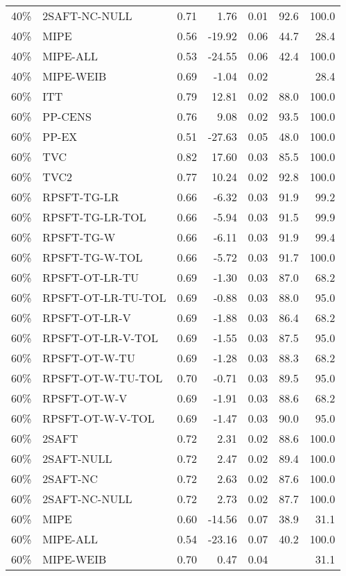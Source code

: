\begin{table}[ht]
{\begin{tabular}{llrrrrr}
  40\% & 2SAFT-NC-NULL & 0.71 & 1.76 & 0.01 & 92.6 & 100.0 \\ 
  40\% & MIPE & 0.56 & -19.92 & 0.06 & 44.7 & 28.4 \\ 
  40\% & MIPE-ALL & 0.53 & -24.55 & 0.06 & 42.4 & 100.0 \\ 
  40\% & MIPE-WEIB & 0.69 & -1.04 & 0.02 &  & 28.4 \\ 
   \hline
60\% & ITT & 0.79 & 12.81 & 0.02 & 88.0 & 100.0 \\ 
  60\% & PP-CENS & 0.76 & 9.08 & 0.02 & 93.5 & 100.0 \\ 
  60\% & PP-EX & 0.51 & -27.63 & 0.05 & 48.0 & 100.0 \\ 
  60\% & TVC & 0.82 & 17.60 & 0.03 & 85.5 & 100.0 \\ 
  60\% & TVC2 & 0.77 & 10.24 & 0.02 & 92.8 & 100.0 \\ 
   \hline
60\% & RPSFT-TG-LR & 0.66 & -6.32 & 0.03 & 91.9 & 99.2 \\ 
  60\% & RPSFT-TG-LR-TOL & 0.66 & -5.94 & 0.03 & 91.5 & 99.9 \\ 
  60\% & RPSFT-TG-W & 0.66 & -6.11 & 0.03 & 91.9 & 99.4 \\ 
  60\% & RPSFT-TG-W-TOL & 0.66 & -5.72 & 0.03 & 91.7 & 100.0 \\ 
  60\% & RPSFT-OT-LR-TU & 0.69 & -1.30 & 0.03 & 87.0 & 68.2 \\ 
  60\% & RPSFT-OT-LR-TU-TOL & 0.69 & -0.88 & 0.03 & 88.0 & 95.0 \\ 
  60\% & RPSFT-OT-LR-V & 0.69 & -1.88 & 0.03 & 86.4 & 68.2 \\ 
  60\% & RPSFT-OT-LR-V-TOL & 0.69 & -1.55 & 0.03 & 87.5 & 95.0 \\ 
   \hline
60\% & RPSFT-OT-W-TU & 0.69 & -1.28 & 0.03 & 88.3 & 68.2 \\ 
  60\% & RPSFT-OT-W-TU-TOL & 0.70 & -0.71 & 0.03 & 89.5 & 95.0 \\ 
  60\% & RPSFT-OT-W-V & 0.69 & -1.91 & 0.03 & 88.6 & 68.2 \\ 
  60\% & RPSFT-OT-W-V-TOL & 0.69 & -1.47 & 0.03 & 90.0 & 95.0 \\ 
   \hline
60\% & 2SAFT & 0.72 & 2.31 & 0.02 & 88.6 & 100.0 \\ 
  60\% & 2SAFT-NULL & 0.72 & 2.47 & 0.02 & 89.4 & 100.0 \\ 
  60\% & 2SAFT-NC & 0.72 & 2.63 & 0.02 & 87.6 & 100.0 \\ 
  60\% & 2SAFT-NC-NULL & 0.72 & 2.73 & 0.02 & 87.7 & 100.0 \\ 
  60\% & MIPE & 0.60 & -14.56 & 0.07 & 38.9 & 31.1 \\ 
  60\% & MIPE-ALL & 0.54 & -23.16 & 0.07 & 40.2 & 100.0 \\ 
  60\% & MIPE-WEIB & 0.70 & 0.47 & 0.04 &  & 31.1 \\ 
   \hline
\end{tabular}
}
\end{table}
